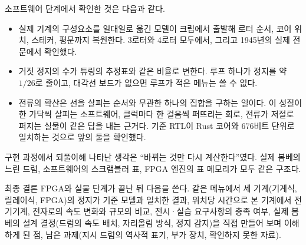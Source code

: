 소프트웨어 단계에서 확인한 것은 다음과 같다.

\begin{itemize}
\item 실제 기계의 구성요소를 일대일로 옮긴 모델이 크립에서 출발해 로터 순서, 코어 위치, 스테커, 평문까지
복원한다. 3로터와 4로터 모두에서, 그리고 1945년의 실제 전문에서 확인했다.
\item 거짓 정지의 수가 튜링의 추정표와 같은 비율로 변한다. 루프 하나가 정지를 약 $1/26$로 줄이고,
대각선 보드가 없으면 루프가 적은 메뉴는 쓸 수 없다.
\item 전류의 확산은 선을 살피는 순서와 무관한 하나의 집합을 구하는 일이다. 이 성질이 한 가닥씩 살피는
소프트웨어, 클럭마다 한 걸음씩 퍼뜨리는 회로, 전류가 저절로 퍼지는 실물이 같은 답을 내는 근거다.
기준 RTL이 Rust 코어와 676비트 단위로 일치하는 것으로 앞의 둘을 확인했다.
\end{itemize}

구현 과정에서 되풀이해 나타난 생각은 ``바뀌는 것만 다시 계산한다''였다. 실제 봄베의 느린 드럼,
소프트웨어의 스크램블러 표, FPGA 엔진의 표 메모리가 모두 같은 구조다.

\begin{todobox}{최종 결론}
FPGA와 실물 단계가 끝난 뒤 다음을 쓴다. 같은 메뉴에서 세 기계(기계식, 릴레이식, FPGA)의 정지가 기준
모델과 일치한 결과, 위치당 시간으로 본 기계에서 전기기계, 전자로의 속도 변화와 규모의 비교, 전시·실습
요구사항의 충족 여부, 실제 봄베의 설계 결정(드럼의 속도 배치, 자리올림 방식, 정지 감지)을 직접 만들어 보며 이해하게 된
점, 남은 과제(지시 드럼의 역사적 표기, 부가 장치, 확인하지 못한 자료).
\end{todobox}
